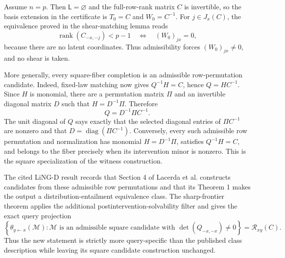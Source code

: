 Assume \(n=p\). Then \(\mathsf L=\varnothing\) and the full-row-rank matrix \(C\) is invertible, so the basis extension in the certificate is \(T_0=C\) and \(W_0=C^{-1}\). For \(j\in J_x(C)\), the equivalence proved in the shear-matching lemma reads
\[
 \operatorname{rank}(C_{-x,-j})<p-1
 \quad\Longleftrightarrow\quad (W_0)_{jx}=0,
\]
because there are no latent coordinates. Thus admissibility forces \((W_0)_{jx}\ne0\), and no shear is taken.

More generally, every square-fiber completion is an admissible row-permutation candidate. Indeed, fixed-law matching now gives \(Q^{-1}H=C\), hence \(Q=HC^{-1}\). Since \(H\) is monomial, there are a permutation matrix \(\Pi\) and an invertible diagonal matrix \(D\) such that \(H=D^{-1}\Pi\). Therefore
\[
 Q=D^{-1}\Pi C^{-1}.
\]
The unit diagonal of \(Q\) says exactly that the selected diagonal entries of \(\Pi C^{-1}\) are nonzero and that \(D=\operatorname{diag}(\Pi C^{-1})\). Conversely, every such admissible row permutation and normalization has monomial \(H=D^{-1}\Pi\), satisfies \(Q^{-1}H=C\), and belongs to the fiber precisely when its intervention minor is nonzero. This is the square specialization of the witness construction.

The cited LiNG-D result records that Section 4 of Lacerda et al. constructs candidates from these admissible row permutations and that its Theorem 1 makes the output a distribution-entailment equivalence class. The sharp-frontier theorem applies the additional postintervention-solvability filter and gives the exact query projection
\[
 \left\{\theta_{y\leftarrow x}(\mathcal M):
 \mathcal M\text{ is an admissible square candidate with }
 \det(Q_{-x,-x})\ne0\right\}
 =\mathcal R_{xy}(C).
\]
Thus the new statement is strictly more query-specific than the published class description while leaving its square candidate construction unchanged.